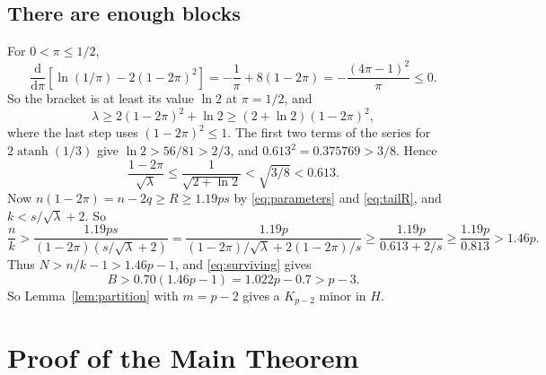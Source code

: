 \documentclass[11pt]{article}
\DeclareMathOperator{\atanh}{atanh}
\newcommand{\dd}{\mathrm d}
\begin{document}
\subsection{There are enough blocks}

For $0<\pi\le1/2$,
\begin{equation*}
 \frac{\dd}{\dd\pi}\left[\ln(1/\pi)-2(1-2\pi)^2\right]
 =-\frac1\pi+8(1-2\pi)=-\frac{(4\pi-1)^2}{\pi}\le0.
\end{equation*}
So the bracket is at least its value $\ln2$ at $\pi=1/2$, and
\begin{equation*}
 \lambda\ge2(1-2\pi)^2+\ln2
 \ge(2+\ln2)(1-2\pi)^2,
\end{equation*}
where the last step uses $(1-2\pi)^2\le1$. The first two terms of the series
for $2\atanh(1/3)$ give $\ln2>56/81>2/3$, and $0.613^2=0.375769>3/8$. Hence
\begin{equation*}
 \frac{1-2\pi}{\sqrt\lambda}
 \le\frac1{\sqrt{2+\ln2}}<\sqrt{3/8}<0.613.
\end{equation*}
Now $n(1-2\pi)=n-2q\ge R\ge1.19ps$ by \eqref{eq:parameters} and
\eqref{eq:tailR}, and $k<s/\sqrt\lambda+2$. So
\begin{equation*}
 \frac nk
 >\frac{1.19ps}{(1-2\pi)(s/\sqrt\lambda+2)}
 =\frac{1.19p}{(1-2\pi)/\sqrt\lambda+2(1-2\pi)/s}
 \ge\frac{1.19p}{0.613+2/s}
 \ge\frac{1.19p}{0.813}>1.46p.
\end{equation*}
Thus $N>n/k-1>1.46p-1$, and \eqref{eq:surviving} gives
\begin{equation*}
 B>0.70(1.46p-1)=1.022p-0.7>p-3.
\end{equation*}
So Lemma~\ref{lem:partition} with $m=p-2$ gives a $K_{p-2}$ minor in $H$.

\section{Proof of the Main Theorem}\label{sec:proof}
\end{document}
